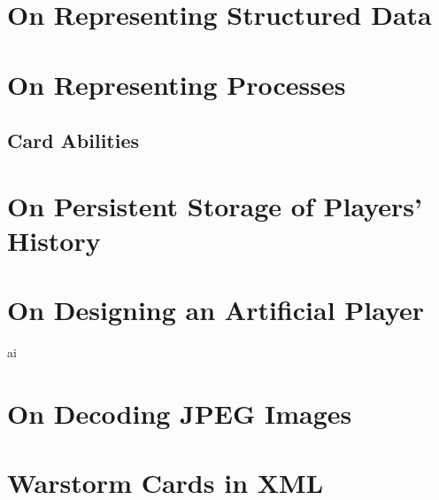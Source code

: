 \documentclass[10pt,oneside,a4paper]{skh-scrreprt}
\begin{document}

\chapter{On Representing Structured Data}





\chapter{On Representing Processes}

\section{Card Abilities}

\chapter{On Persistent Storage of Players' History}

\chapter{On Designing an Artificial Player}
\gls{ai}
\chapter{On Decoding JPEG Images}

\appendix

\chapter{Warstorm Cards in XML}\label{chap:cards-in-xml}

\end{document}

